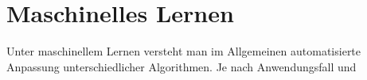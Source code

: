\chapter{Maschinelles Lernen}
\label{ch:maschinelles lernen}

Unter maschinellem Lernen versteht man im Allgemeinen automatisierte Anpassung unterschiedlicher Algorithmen. Je nach Anwendungsfall und 